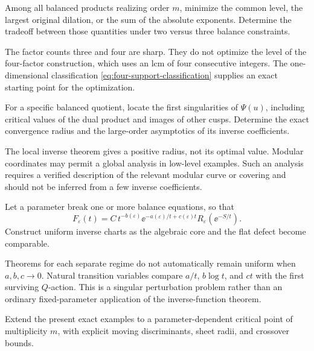 \begin{question}
Among all balanced products realizing order \(m\), minimize
the common level, the largest original dilation, or the sum of
the absolute exponents.  Determine the tradeoff between those
quantities under two versus three balance constraints.
\end{question}

The factor counts three and four are sharp.
They do not optimize the level of the four-factor construction,
which uses an lcm of four consecutive integers.
The one-dimensional classification
\cref{eq:four-support-classification} supplies an exact starting
point for the optimization.

\begin{question}
For a specific balanced quotient, locate the first singularities
of \(\Psi(u)\), including critical values of the dual product
and images of other cusps.  Determine the exact convergence
radius and the large-order asymptotics of its inverse coefficients.
\end{question}

The local inverse theorem gives a positive radius, not its
optimal value.  Modular coordinates may permit a global analysis
in low-level examples.  Such an analysis requires a verified
description of the relevant modular curve or covering and should
not be inferred from a few inverse coefficients.

\begin{question}
Let a parameter break one or more balance equations, so that
\[
 F_\varepsilon(t)=
 C\,t^{-b(\varepsilon)}
 \ee^{-a(\varepsilon)/t+c(\varepsilon)t}
 R_\varepsilon(\ee^{-S/t}).
\]
Construct uniform inverse charts as the algebraic core and the
flat defect become comparable.
\end{question}

Theorems for each separate regime do not automatically remain
uniform when \(a,b,c\to0\).
Natural transition variables compare
\(a/t\), \(b\log t\), and \(ct\) with
the first surviving \(Q\)-action.
This is a singular perturbation problem rather than an ordinary
fixed-parameter application of the inverse-function theorem.

\begin{question}
Extend the present exact examples to a parameter-dependent
critical point of multiplicity \(m\), with explicit moving
discriminants, sheet radii, and crossover bounds.
\end{question}

